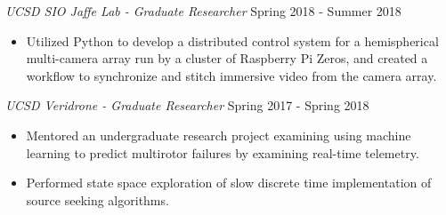 \documentclass[line,margin]{res}
\begin{document}
\begin{resume}
	{\sl UCSD SIO Jaffe Lab - Graduate Researcher} \hfill Spring 2018 - Summer 2018
	\begin{itemize}
		\item Utilized Python to develop a distributed control system for a hemispherical multi-camera array run by a cluster of Raspberry Pi Zeros, and created a workflow to synchronize and stitch immersive video from the camera array.
	\end{itemize}

	{\sl UCSD Veridrone - Graduate Researcher} \hfill Spring 2017 - Spring 2018
	\begin{itemize}
		\item Mentored an undergraduate research project examining using machine learning to predict multirotor failures by examining real-time telemetry.
		\item Performed state space exploration of slow discrete time implementation of source seeking algorithms.
	\end{itemize}



\end{resume}
\end{document}
